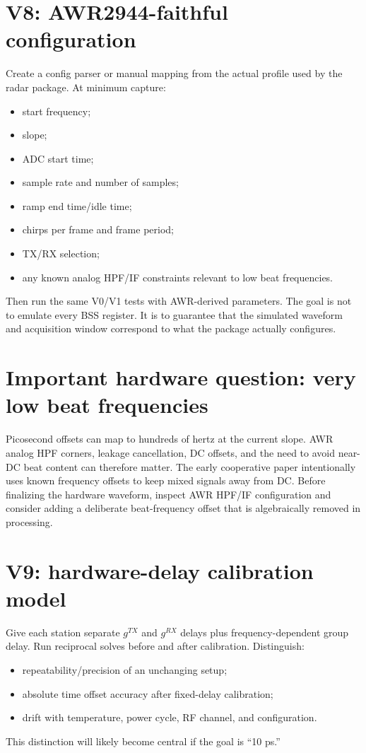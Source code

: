 \documentclass[11pt]{article}
\begin{document}
\section{V8: AWR2944-faithful configuration}
Create a config parser or manual mapping from the actual profile used by the radar package. At minimum capture:
\begin{itemize}
\item start frequency;
\item slope;
\item ADC start time;
\item sample rate and number of samples;
\item ramp end time/idle time;
\item chirps per frame and frame period;
\item TX/RX selection;
\item any known analog HPF/IF constraints relevant to low beat frequencies.
\end{itemize}

Then run the same V0/V1 tests with AWR-derived parameters. The goal is not to emulate every BSS register. It is to guarantee that the simulated waveform and acquisition window correspond to what the package actually configures.

\section{Important hardware question: very low beat frequencies}
Picosecond offsets can map to hundreds of hertz at the current slope. AWR analog HPF corners, leakage cancellation, DC offsets, and the need to avoid near-DC beat content can therefore matter. The early cooperative paper intentionally uses known frequency offsets to keep mixed signals away from DC. Before finalizing the hardware waveform, inspect AWR HPF/IF configuration and consider adding a deliberate beat-frequency offset that is algebraically removed in processing.

\section{V9: hardware-delay calibration model}
Give each station separate $g^{TX}$ and $g^{RX}$ delays plus frequency-dependent group delay. Run reciprocal solves before and after calibration. Distinguish:
\begin{itemize}
\item repeatability/precision of an unchanging setup;
\item absolute time offset accuracy after fixed-delay calibration;
\item drift with temperature, power cycle, RF channel, and configuration.
\end{itemize}
This distinction will likely become central if the goal is ``10 ps.''
\end{document}
